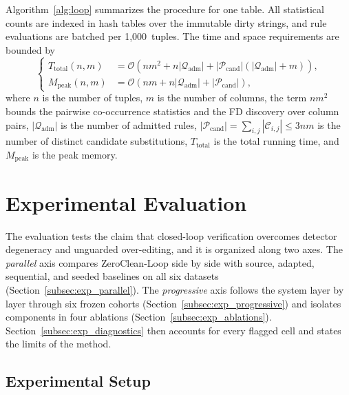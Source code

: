 \documentclass[conference]{IEEEtran}
\begin{document}
Algorithm~\ref{alg:loop} summarizes the procedure for one table. All statistical counts are indexed in hash tables over the immutable dirty strings, and rule evaluations are batched per 1,000~tuples. The time and space requirements are bounded by
\begin{equation}
\label{eq:complexity}
\left\{
\begin{aligned}
T_{\mathrm{total}}(n, m) &= \mathcal{O}\!\left(n m^2 + n \left|\mathcal{Q}_{\mathrm{adm}}\right| + \left|\mathcal{P}_{\mathrm{cand}}\right| \!\left(\left|\mathcal{Q}_{\mathrm{adm}}\right| + m\right)\right), \\
M_{\mathrm{peak}}(n, m) &= \mathcal{O}\!\left(n m + n \left|\mathcal{Q}_{\mathrm{adm}}\right| + \left|\mathcal{P}_{\mathrm{cand}}\right|\right),
\end{aligned}
\right.
\end{equation}
where $n$ is the number of tuples, $m$ is the number of columns, the term $n m^2$ bounds the pairwise co-occurrence statistics and the FD discovery over column pairs, $|\mathcal{Q}_{\mathrm{adm}}|$ is the number of admitted rules, $|\mathcal{P}_{\mathrm{cand}}| = \sum_{i,j} |\mathcal{C}_{i,j}| \le 3 n m$ is the number of distinct candidate substitutions, $T_{\mathrm{total}}$ is the total running time, and $M_{\mathrm{peak}}$ is the peak memory.

\section{Experimental Evaluation}
\label{sec:experiments}

The evaluation tests the claim that closed-loop verification overcomes detector degeneracy and unguarded over-editing, and it is organized along two axes. The \emph{parallel} axis compares ZeroClean-Loop side by side with source, adapted, sequential, and seeded baselines on all six datasets (Section~\ref{subsec:exp_parallel}). The \emph{progressive} axis follows the system layer by layer through six frozen cohorts (Section~\ref{subsec:exp_progressive}) and isolates components in four ablations (Section~\ref{subsec:exp_ablations}). Section~\ref{subsec:exp_diagnostics} then accounts for every flagged cell and states the limits of the method.

\subsection{Experimental Setup}
\label{subsec:exp_setup}


\end{document}
